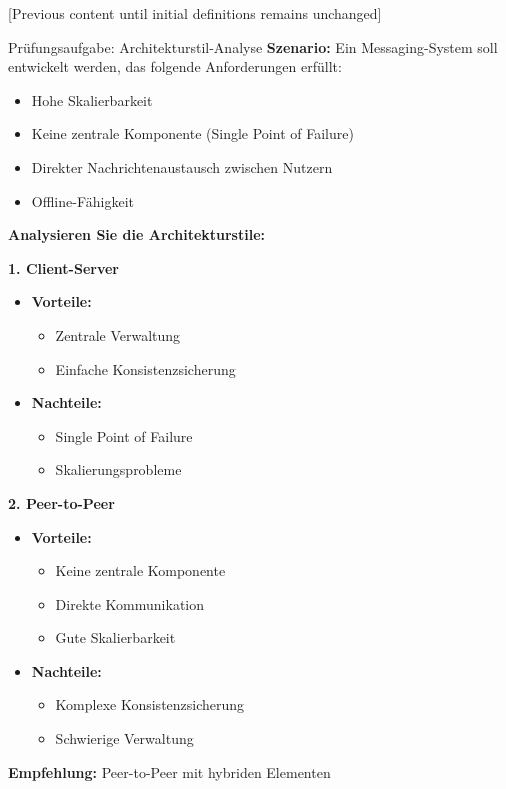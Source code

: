 [Previous content until initial definitions remains unchanged]

\begin{example}{Prüfungsaufgabe: Architekturstil-Analyse}
\textbf{Szenario:}
Ein Messaging-System soll entwickelt werden, das folgende Anforderungen erfüllt:
\begin{itemize}
    \item Hohe Skalierbarkeit
    \item Keine zentrale Komponente (Single Point of Failure)
    \item Direkter Nachrichtenaustausch zwischen Nutzern
    \item Offline-Fähigkeit
\end{itemize}

\textbf{Analysieren Sie die Architekturstile:}

\textbf{1. Client-Server}
\begin{itemize}
    \item \textbf{Vorteile:}
    \begin{itemize}
        \item Zentrale Verwaltung
        \item Einfache Konsistenzsicherung
    \end{itemize}
    \item \textbf{Nachteile:}
    \begin{itemize}
        \item Single Point of Failure
        \item Skalierungsprobleme
    \end{itemize}
\end{itemize}

\textbf{2. Peer-to-Peer}
\begin{itemize}
    \item \textbf{Vorteile:}
    \begin{itemize}
        \item Keine zentrale Komponente
        \item Direkte Kommunikation
        \item Gute Skalierbarkeit
    \end{itemize}
    \item \textbf{Nachteile:}
    \begin{itemize}
        \item Komplexe Konsistenzsicherung
        \item Schwierige Verwaltung
    \end{itemize}
\end{itemize}

\textbf{Empfehlung:} Peer-to-Peer mit hybriden Elementen
\end{example}

